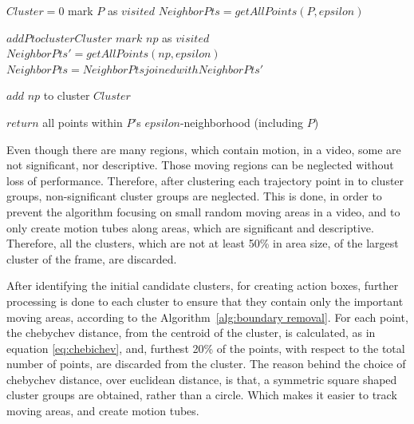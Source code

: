 \begin{algorithm}
 \caption{}
   \label{alg:Clustering algorithm}
    \begin{algorithmic}[1]
        \State $Cluster = 0$
	  \EndIf
            \State mark $P$ as $visited$
            \State $NeighborPts = getAllPoints(P, epsilon)$
          \Else
          \EndIf
        \EndFor
       \EndFunction
       
	\State $add P to cluster Cluster$
	    \State $mark$ $np$ as $visited$
	    \State $NeighborPts' = getAllPoints(np, epsilon)$
            \State $NeighborPts = NeighborPts joined with NeighborPts'$
            \EndIf
	    
	  \EndIf
         \State $add$ $np$ to cluster $Cluster$
         \EndIf
	\EndFor
       \EndFunction
       
       \State $return$ all points within $P$'s $epsilon$-neighborhood (including $P$)
       \EndFunction
\end{algorithmic}

\end{algorithm}


Even though there are many regions, which contain motion, in a video, some are not significant, nor descriptive.
Those moving regions can be neglected without loss of performance. Therefore, after clustering each trajectory point in to cluster groups, 
non-significant cluster groups are neglected.
This is done, in order to prevent the algorithm focusing on small random moving areas in a video, and to only create motion tubes along areas, which are significant and descriptive.
Therefore, all the clusters, which are not at least 50\% in area size, of the largest cluster of the frame, are discarded.

After identifying the initial candidate clusters, for creating action boxes, further processing is done to each cluster to ensure that they 
contain only the important moving areas, according to the Algorithm~\ref{alg:boundary removal}. For each point, the chebychev distance, from the centroid of the cluster, is calculated,
as in
equation \ref{eq:chebichev}, and, furthest 20\% of the points, with respect to the total number of points, are discarded from the cluster. The reason behind the choice of chebychev 
distance, over euclidean distance, is that, a symmetric square shaped cluster groups are obtained, rather than a circle. Which makes it
easier to track moving areas, and create motion tubes. 

